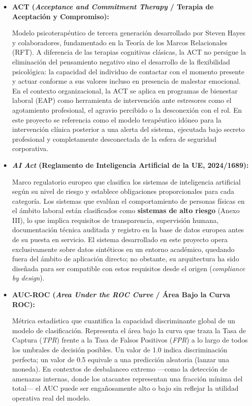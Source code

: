 \documentclass[IB]{TFUOC}%
\begin{document}
\begin{itemize}

    \item \textbf{ACT (\textit{Acceptance and Commitment Therapy} / 
    Terapia de Aceptación y Compromiso):}
    
    Modelo psicoterapéutico de tercera generación desarrollado por Steven Hayes y colaboradores, fundamentado en la Teoría de los Marcos Relacionales (RFT). A diferencia de las terapias cognitivas clásicas, la ACT no persigue la eliminación del pensamiento 
    negativo sino el desarrollo de la flexibilidad psicológica: la capacidad del individuo de contactar con el momento presente y actuar conforme a sus valores incluso en presencia de malestar emocional. En el contexto organizacional, la ACT se aplica en programas de bienestar laboral (EAP) como herramienta de intervención ante estresores como el agotamiento profesional, el agravio percibido o la desconexión con el rol. En este 
    proyecto se referencia como el modelo terapéutico idóneo para la intervención clínica posterior a una alerta del sistema, ejecutada bajo secreto profesional y completamente desconectada de la esfera de seguridad corporativa.

    \item \textbf{\textit{AI Act} (Reglamento de Inteligencia Artificial de la UE, 2024/1689):}
    
    Marco regulatorio europeo que clasifica los sistemas de inteligencia artificial según su nivel de riesgo y establece obligaciones proporcionales para cada categoría. Los sistemas 
    que evalúan el comportamiento de personas físicas en el ámbito laboral están clasificados como \textbf{sistemas de alto riesgo} (Anexo III), lo que implica requisitos de transparencia, supervisión humana, documentación técnica auditada y registro 
    en la base de datos europea antes de su puesta en servicio. 
    El sistema desarrollado en este proyecto opera exclusivamente sobre datos sintéticos en un entorno académico, quedando fuera del ámbito de aplicación directo; no obstante, su arquitectura ha sido diseñada para ser compatible con estos requisitos 
    desde el origen (\textit{compliance by design}).

    \item \textbf{AUC-ROC (\textit{Area Under the ROC Curve} / Área Bajo la Curva ROC):}
    
    Métrica estadística que cuantifica la capacidad discriminante global de un modelo de clasificación. Representa el área bajo la curva que traza la Tasa de Captura (\textit{TPR}) frente a la Tasa de Falsos Positivos (\textit{FPR}) a lo largo de todos los umbrales de decisión posibles. Un valor de 1.0 indica discriminación perfecta; un valor de 0.5 equivale a una predicción aleatoria (lanzar una moneda). En contextos de desbalanceo extremo ---como la detección de amenazas internas, donde los atacantes representan una fracción mínima del total--- el AUC puede ser engañosamente alto o bajo sin reflejar la utilidad operativa real del modelo.


\end{itemize}
\end{document}
